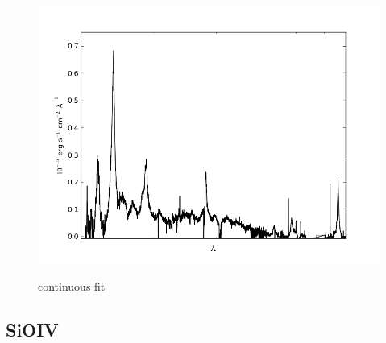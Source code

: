 \documentclass[usenatbib]{mn2e}
\begin{document}
\begin{figure}
\begin{center}
\hspace{5mm}
\includegraphics[width=0.49\linewidth,angle=0]{no_continuous_16.png}\\

\end{center} 
\caption{continuous fit \label{fig:landscape}}   
\end{figure}

\newpage

\subsection{SiOIV}
\end{document}
